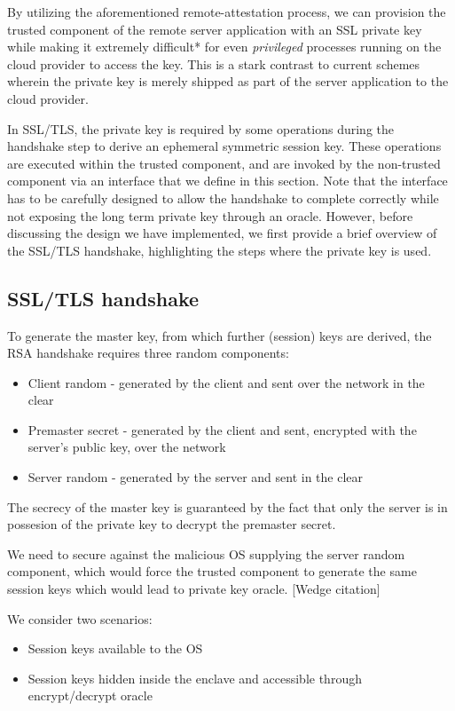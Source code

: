 \documentclass[../main.tex]{subfiles}
\begin{document}
	By utilizing the aforementioned remote-attestation process, we can provision the trusted component 
	of the remote server application with an SSL private key while making it extremely difficult* for even
	\textit{privileged} processes running on the cloud provider to access the key. This is a stark contrast to current
	schemes wherein the private key is merely shipped as part of the server application to the cloud provider. 

	In SSL/TLS, the private key is required by some operations during the handshake step to derive an ephemeral symmetric session key. These operations
	are executed within the trusted component, and are invoked by the non-trusted component via an interface that we define in this section. Note that
	the interface has to be carefully designed to allow the handshake to complete correctly while not exposing the long term private key through an oracle.
	However, before discussing the design we have implemented, we first provide a brief overview of the SSL/TLS handshake, highlighting
	the steps where the private key is used.

	\subsection{SSL/TLS handshake}
	To generate the master key, from which further (session) keys
	are derived, the RSA handshake requires three random components:
	\begin{itemize}
		\item Client random - generated by the client and sent over the network in the clear
		\item Premaster secret - generated by the client and sent, encrypted with the server's public key, over the network
		\item Server random - generated by the server and sent in the clear
	\end{itemize}

	The secrecy of the master key is guaranteed by the fact that only the server is in possesion of the private key to decrypt the premaster secret.

	We need to secure against the malicious OS supplying the server random component, which would force the trusted component to generate the same session keys which would lead to private key oracle. [Wedge citation]


	We consider two scenarios:
	\begin{itemize}
		\item Session keys available to the OS
		\item Session keys hidden inside the enclave and accessible through encrypt/decrypt oracle
	\end{itemize}
\end{document}
